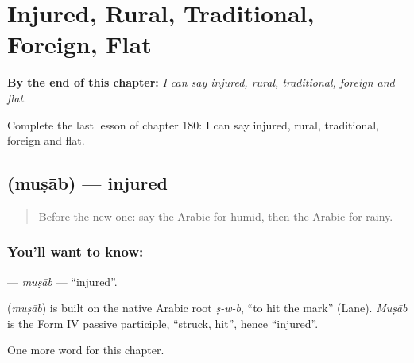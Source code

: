 
\chapter{Injured, Rural, Traditional, Foreign, Flat}
\label{ch:ar-injured-rural-traditional-foreign-flat}

\begin{chapteropening}
\textbf{By the end of this chapter:} \emph{I can say injured, rural, traditional, foreign and flat.}

Complete the last lesson of chapter 180: I can say injured, rural, traditional, foreign and flat.
\end{chapteropening}

\section[\texorpdfstring{\ar{مصاب} (muṣāb)}{مصاب (muṣāb)}]{ (muṣāb) — injured}

\label{lesson:AR-C180-musab}



\begin{quote}
Before the new one: say the Arabic for humid, then the Arabic for rainy.
\end{quote}

\subsection*{You'll want to know: }
\textbf{} — \emph{muṣāb} — \textquotedblleft{}injured\textquotedblright{}.

\begin{cousinweb}
\textbf{} (\emph{muṣāb}) is built on the native Arabic root \emph{ṣ-w-b}, \textquotedblleft{}to hit the mark\textquotedblright{} (Lane). \emph{Muṣāb} is the Form IV passive participle, \textquotedblleft{}struck, hit\textquotedblright{}, hence \textquotedblleft{}injured\textquotedblright{}.
\end{cousinweb}

\begin{grammarlens}[title={What you've built}]
One more word for this chapter.
\end{grammarlens}

